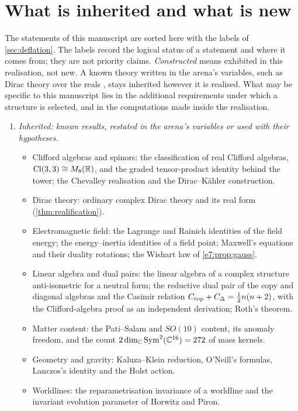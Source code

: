 \section{What is inherited and what is new}
\label{sec:rel:novelty}

The statements of this manuscript are sorted here with the labels of \cref{sec:deflation}. The labels record the logical status of a statement
and where it comes from; they are not priority claims. \emph{Constructed} means exhibited in this realisation, not new. A known theory
written in the arena's variables, such as Dirac theory over the reals \cite{Hestenes67}, stays inherited however it is realised. What may be
specific to this manuscript lies in the additional requirements under which a structure is selected, and in the computations made inside the
realisation.
\begin{enumerate}[label=(\roman*),leftmargin=2.2em]
\item \emph{Inherited: known results, restated in the arena's variables or used with their hypotheses.}
  \begin{itemize}
  \item Clifford algebras and spinors: the classification of real Clifford algebras, $\mathrm{Cl}(3,3)\cong M_8(\mathbb{R})$, and the graded tensor-product
  identity behind the tower; the Chevalley realisation and the Dirac--K\"ahler construction.
  \item Dirac theory: ordinary complex Dirac theory and its real form (\cref{thm:realification}).
  \item Electromagnetic field: the Lagrange and Rainich identities of the field energy; the energy--inertia identities of a field point; Maxwell's
  equations and their duality rotations; the Wishart law of \cref{e7:prop:gauss}.
  \item Linear algebra and dual pairs: the linear algebra of a complex structure anti-isometric for a neutral form; the reductive dual pair of
  the copy and diagonal algebras and the Casimir relation $C_{\rm cop}+C_\Delta=\tfrac12n(n+2)$, with the Clifford-algebra proof as an
  independent derivation; Roth's theorem.
  \item Matter content: the Pati--Salam and $SO(10)$ content, its anomaly freedom, and the count
  $2\dim_{\mathbb{C}}\operatorname{Sym}^2(\mathbb{C}^{16})=272$ of mass kernels.
  \item Geometry and gravity: Kaluza--Klein reduction, O'Neill's formulas, Lanczos's identity and the Holst action.
  \item Worldlines: the reparametrisation invariance of a worldline and the invariant evolution parameter of Horwitz and Piron.

\end{itemize}
\end{enumerate}
